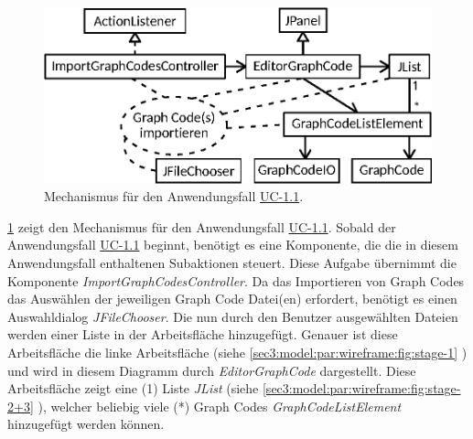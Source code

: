 \begin{figure}[htb]
    \centering
    \includegraphics{chapter/chapter_3/mechanisms/mechanism-uc-1.1.eps}
    \caption{Mechanismus für den Anwendungsfall \hyperref[sec3:model:uc-1.1]{UC-1.1}.}
    \label{sec3:model:par:mechanism-use-cases:fig:mech-uc-1.1}
\end{figure}
\cref{sec3:model:par:mechanism-use-cases:fig:mech-uc-1.1} zeigt den Mechanismus für den Anwendungsfall \hyperref[sec3:model:uc-1.1]{UC-1.1}.
Sobald der Anwendungsfall \hyperref[sec3:model:uc-1.1]{UC-1.1} beginnt, benötigt es eine Komponente, die die in diesem Anwendungsfall enthaltenen Subaktionen steuert.
Diese Aufgabe übernimmt die Komponente \textit{ImportGraphCodesController}.
Da das Importieren von Graph Codes das Auswählen der jeweiligen Graph Code Datei(en) erfordert, benötigt es einen Auswahldialog \textit{JFileChooser}.
Die nun durch den Benutzer ausgewählten Dateien werden einer Liste in der Arbeitsfläche hinzugefügt.
Genauer ist diese Arbeitsfläche die linke Arbeitsfläche (siehe \cref{sec3:model:par:wireframe:fig:stage-1} ) und wird in diesem Diagramm durch \textit{EditorGraphCode} dargestellt.
Diese Arbeitsfläche zeigt eine (1) Liste \textit{JList} (siehe \cref{sec3:model:par:wireframe:fig:stage-2+3} ), welcher beliebig viele (*) Graph Codes \textit{GraphCodeListElement} hinzugefügt werden können.

